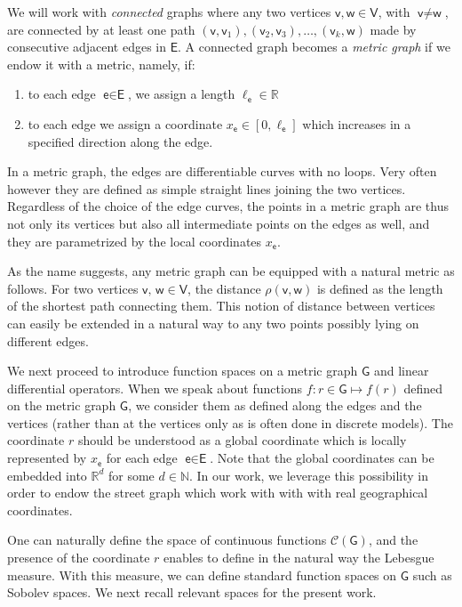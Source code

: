 \documentclass[11pt,a4paper,twoside]{article}
\theoremstyle{definition}
\numberwithin{equation}{section}
\newcommand{\cC}{\ensuremath{\mathcal{C}}}
\newcommand{\bN}{\ensuremath{\mathbb{N}}}
\newcommand{\bR}{\ensuremath{\mathbb{R}}}
\newcommand{\G}{\ensuremath{\textsf{G}}} %
\newcommand{\E}{\ensuremath{\textsf{E}}} %
\newcommand{\V}{\ensuremath{\textsf{V}}} %
\newcommand{\vv}{\ensuremath{\textsf{v}}}
\newcommand{\ww}{\ensuremath{\textsf{w}}}
\newcommand{\ee}{\ensuremath{\textsf{e}}}
\newcommand{\<}{\langle}
\renewcommand{\>}{\rangle}
\begin{document}
We will work with \emph{connected} graphs where any two vertices $\vv, \ww\in\V$, with $\vv\neq \ww$, are connected by at least one path $(\vv, \vv_1), (\vv_2, \vv_3),\dots, (\vv_k, \ww)$ made by consecutive adjacent edges in $\E$. A connected graph becomes a \emph{metric graph} if we endow it with a metric, namely, if:
\begin{enumerate}
      \item to each edge $\ee\in\E$, we assign a length $\ell_\ee \in \bR$
      \item to each edge we assign a coordinate $x_\ee \in [0, \ell_\ee]$ which increases in a specified direction along the edge.
\end{enumerate}
In a metric graph, the edges are differentiable curves with no loops. Very often however they are defined as simple straight lines joining the two vertices. Regardless of the choice of the edge curves, the points in a metric graph are thus not only its vertices but also all intermediate points on the edges as well, and they are parametrized by the local coordinates $x_\ee$.

As the name suggests, any metric graph can be equipped with a natural metric as follows. For two vertices $\vv,\,\ww\in \V$, the distance $\rho(\vv,\ww)$ is defined as the length of the shortest path connecting them. This notion of distance between vertices can easily be extended in a natural way to any two points possibly lying on different edges.

We next proceed to introduce function spaces on a metric graph $\G$ and linear differential operators. When we speak about functions $f:r\in \G\mapsto f(r)$ defined on the metric graph $\G$, we consider them as defined along the edges and the vertices (rather than at the vertices only as is often done in discrete models). The coordinate $r$ should be understood as a global coordinate which is locally represented by $x_\ee$ for each edge $\ee\in \E$. Note that the global coordinates can be embedded into $\bR^d$ for some $d\in \bN$. In our work, we leverage this possibility in order to endow the street graph which work with with with real geographical coordinates.

One can naturally define the space of continuous functions $\cC(\G)$, and the presence of the coordinate $r$ enables to define in the natural way the Lebesgue measure. With this measure, we can define standard function spaces on $\G$ such as Sobolev spaces. We next recall relevant spaces for the present work.

\end{document}
